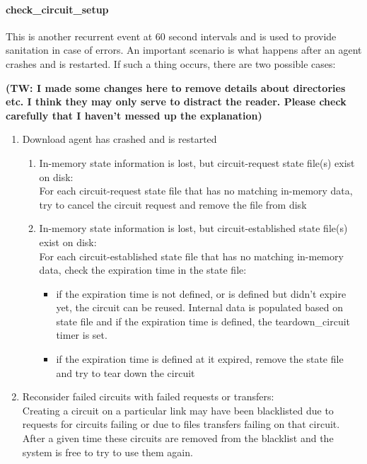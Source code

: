 \paragraph{check\_circuit\_setup}

This is another recurrent event at 60 second intervals and is used to provide
sanitation in case of errors. An important scenario is what happens after an
agent crashes and is restarted. If such a thing occurs, there are two possible
cases:

\textbf{(TW: I made some changes here to remove details about directories etc. I think they may only serve to distract the reader. Please check carefully that I haven't messed up the explanation)}
\begin{enumerate}
  \item Download agent has crashed and is restarted
  \begin{enumerate}
    \item In-memory state information is lost, but circuit-request state file(s) exist on disk:\\
			For each circuit-request state file that has no matching in-memory data,
			try to cancel the circuit request and remove the file from disk
    \item In-memory state information is lost, but circuit-established state file(s) exist on disk:\\
			For each circuit-established state file that has no matching in-memory data,
			check the expiration time in the state file:
			\begin{itemize}
			  \item if the expiration time is not defined, or is defined but didn't expire yet,
					  the circuit can be reused. Internal data is populated based on state
					 file and if the expiration time is defined, the teardown\_circuit timer is
					 set.
			  \item if the expiration time is defined at it expired, remove the state file and
					 try to tear down the circuit 
			\end{itemize}
  \end{enumerate}
  \item Reconsider failed circuits with failed requests or transfers:\\
		  Creating a circuit on a particular link may have been blacklisted due to requests
		  for circuits failing or due to files transfers failing on that circuit. After a given
		  time these circuits are removed from the blacklist and the system is free to try
		  to use them again.
\end{enumerate}


